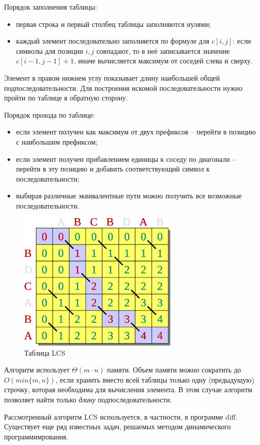 \documentclass[a4paper,11pt]{article}
\begin{document}
Порядок заполнения таблицы:
\begin{itemize}
\item первая строка и первый столбец таблицы заполняются нулями;
\item каждый элемент последовательно заполняется по формуле для $c[i, j]$: если
символы для позиции $i, j$ совпадают, то в неё записывается значение
$c[i-1, j-1]+1$, иначе вычисляется максимум от соседей слева и сверху.
\end{itemize}
Элемент в правом нижнем углу показывает длину наибольшей общей
подпоследовательности. Для построения искомой последовательности нужно пройти
по таблице в обратную сторону.

Порядок прохода по таблице:
\begin{itemize}
\item если элемент получен как максимум от двух префиксов -- перейти в позицию
  с наибольшим префиксом;
\item если элемент получен прибавлением единицы к соседу по диагонали -- перейти
в эту позицию и добавить соответствующий символ к последовательности;
\item выбирая различные эквивалентные пути можно получить все возможные
последовательности.
\end{itemize}
\begin{figure}[h!]
  \centering
  \includegraphics[width=3in]{lecture8/table2.eps}
  \caption{Таблица LCS}
\end{figure}

Алгоритм использует $\Theta(m \cdot n)$ памяти. Объем памяти можно сократить
до $O(min\{m, n\})$, если хранить вместо всей таблицы только одну (предыдущую)
строчку, которая необходима для вычисления элемента. В этом случае алгоритм
позволяет найти только \emph{длину} подпоследовательности.

Рассмотренный алгоритм LCS используется, в частности, в программе diff.
Существует еще ряд известных задач, решаемых методом динамического
программимрования.
\end{document}
